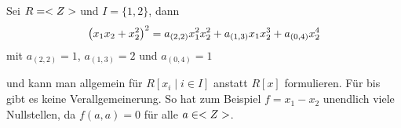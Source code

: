 \begin{example}
	Sei $R = <Z>$ und $I = \{1,2\}$, dann
	\begin{align}
		\left( x_1 x_2 + x_2^2 \right)^2 = a_{(2,2)}x_1^2 x_2^2 + a_{(1,3)}x_1 x_2^3 + a_{(0,4)}x_2^4\notag	
	\end{align}
	mit $a_{(2,2)} = 1$, $a_{(1,3)} = 2$ und $a_{(0,4)} = 1$
\end{example}

\begin{remark}
	 und  kann man allgemein für $R[x_i \mid i \in I]$ anstatt $R[x]$ formulieren. Für  bis  gibt es keine Verallgemeinerung. So hat zum Beispiel $f = x_1 - x_2$ unendlich viele Nullstellen, da $f(a,a) = 0$ für alle $a \in <Z>$.
\end{remark}